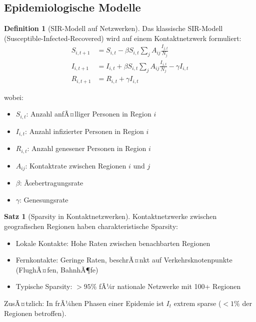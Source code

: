 ﻿\documentclass[a4paper,12pt]{report}
\theoremstyle{definition}
\newtheorem{definition}{Definition}
\newtheorem{satz}{Satz}
\begin{document}
	\subsection{Epidemiologische Modelle}
	
	\begin{definition}[SIR-Modell auf Netzwerken]
		Das klassische SIR-Modell (Susceptible-Infected-Recovered) wird auf einem Kontaktnetzwerk formuliert:
		\begin{align}
			S_{i,t+1} &= S_{i,t} - \beta S_{i,t} \sum_{j} A_{ij} \frac{I_{j,t}}{N_j} \\
			I_{i,t+1} &= I_{i,t} + \beta S_{i,t} \sum_{j} A_{ij} \frac{I_{j,t}}{N_j} - \gamma I_{i,t} \\
			R_{i,t+1} &= R_{i,t} + \gamma I_{i,t}
		\end{align}
		
		wobei:
		\begin{itemize}
			\item $S_{i,t}$: Anzahl anfÃ¤lliger Personen in Region $i$
			\item $I_{i,t}$: Anzahl infizierter Personen in Region $i$
			\item $R_{i,t}$: Anzahl genesener Personen in Region $i$
			\item $A_{ij}$: Kontaktrate zwischen Regionen $i$ und $j$
			\item $\beta$: Ãœbertragungsrate
			\item $\gamma$: Genesungsrate
		\end{itemize}
	\end{definition}
	
	\begin{satz}[Sparsity in Kontaktnetzwerken]
		Kontaktnetzwerke zwischen geografischen Regionen haben charakteristische Sparsity:
		\begin{itemize}
			\item Lokale Kontakte: Hohe Raten zwischen benachbarten Regionen
			\item Fernkontakte: Geringe Raten, beschrÃ¤nkt auf Verkehrsknotenpunkte (FlughÃ¤fen, BahnhÃ¶fe)
			\item Typische Sparsity: $> 95\%$ fÃ¼r nationale Netzwerke mit 100+ Regionen
		\end{itemize}
		
		ZusÃ¤tzlich: In frÃ¼hen Phasen einer Epidemie ist $I_t$ extrem sparse ($< 1\%$ der Regionen betroffen).
	\end{satz}
	
\end{document}
